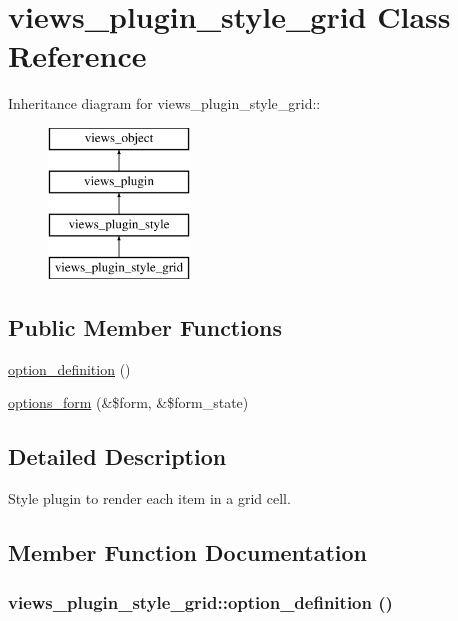 \hypertarget{classviews__plugin__style__grid}{
\section{views\_\-plugin\_\-style\_\-grid Class Reference}
\label{classviews__plugin__style__grid}
}
Inheritance diagram for views\_\-plugin\_\-style\_\-grid::\begin{figure}[H]
\begin{center}
\leavevmode
\includegraphics[height=4cm]{classviews__plugin__style__grid}
\end{center}
\end{figure}
\subsection*{Public Member Functions}
\begin{CompactItemize}
\item 
\hyperlink{classviews__plugin__style__grid_f20dafba4e79fdb15ff8553d2733552b}{option\_\-definition} ()
\item 
\hyperlink{classviews__plugin__style__grid_275eb0e00406028e000268ae389d17a3}{options\_\-form} (\&\$form, \&\$form\_\-state)
\end{CompactItemize}


\subsection{Detailed Description}
Style plugin to render each item in a grid cell. 

\subsection{Member Function Documentation}
\hypertarget{classviews__plugin__style__grid_f20dafba4e79fdb15ff8553d2733552b}{
\subsubsection[{option\_\-definition}]{\setlength{\rightskip}{0pt plus 5cm}views\_\-plugin\_\-style\_\-grid::option\_\-definition ()}}
\label{classviews__plugin__style__grid_f20dafba4e79fdb15ff8553d2733552b}


